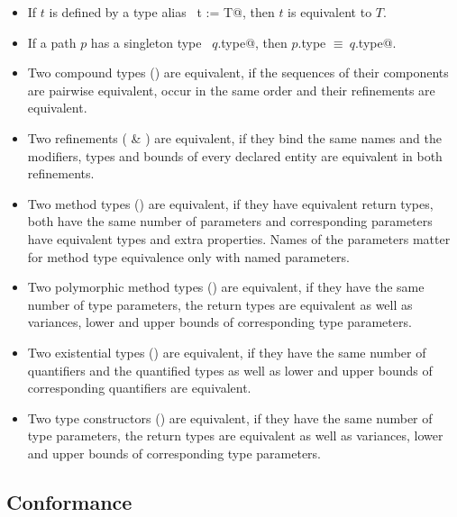 \begin{itemize}
\item
If $t$ is defined by a type alias ~\lstinline@type t := T@, then $t$ is equivalent to $T$. 

\item
If a path $p$ has a singleton type ~\lstinline@$q$.type@, then \lstinline@$p$.type $\equiv\ q$.type@. 

\item
Two compound types () are equivalent, if the sequences of their components are pairwise equivalent, occur in the same order and their refinements are equivalent.

\item
Two refinements ( \& ) are equivalent, if they bind the same names and the modifiers, types and bounds of every declared entity are equivalent in both refinements. 

\item
Two method types () are equivalent, if they have equivalent return types, both have the same number of parameters and corresponding parameters have equivalent types and extra properties. Names of the parameters matter for method type equivalence only with named parameters. 

\item
Two polymorphic method types () are equivalent, if they have the same number of type parameters, the return types are equivalent as well as variances, lower and upper bounds of corresponding type parameters. 

\item
Two existential types () are equivalent, if they have the same number of quantifiers and the quantified types as well as lower and upper bounds of corresponding quantifiers are equivalent. 

\item
Two type constructors () are equivalent, if they have the same number of type parameters, the return types are equivalent as well as variances, lower and upper bounds of corresponding type parameters. 

\end{itemize}






\subsection{Conformance}
\label{sec:conformance}

